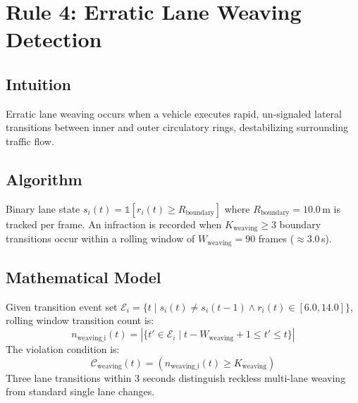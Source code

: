 \documentclass[12pt,a4paper]{report}
\begin{document}
\section{Rule 4: Erratic Lane Weaving Detection}
\label{sec:rule4}

\subsection{Intuition}
Erratic lane weaving occurs when a vehicle executes rapid, un-signaled lateral transitions between inner and outer circulatory rings, destabilizing surrounding traffic flow.

\subsection{Algorithm}
Binary lane state $s_i(t) = \mathbb{1}[r_i(t) \ge R_{\text{boundary}}]$ where $R_{\text{boundary}} = 10.0$\,m is tracked per frame. An infraction is recorded when $K_{\text{weaving}} \ge 3$ boundary transitions occur within a rolling window of $W_{\text{weaving}} = 90$ frames ($\approx 3.0$\,s).

\subsection{Mathematical Model}
Given transition event set $\mathcal{E}_i = \{ t \mid s_i(t) \neq s_i(t{-}1) \land r_i(t) \in [6.0, 14.0] \}$, rolling window transition count is:
\begin{equation}
    n_{\text{weaving\_i}}(t) = | \{ t' \in \mathcal{E}_i \mid t - W_{\text{weaving}} + 1 \le t' \le t \} |
\end{equation}
The violation condition is:
\begin{equation}
    \mathcal{C}_{\text{weaving}}(t) = \left( n_{\text{weaving\_i}}(t) \ge K_{\text{weaving}} \right)
\end{equation}
Three lane transitions within 3 seconds distinguish reckless multi-lane weaving from standard single lane changes.
\end{document}

